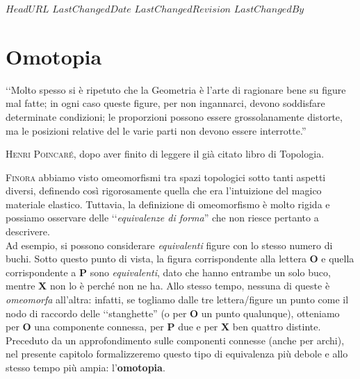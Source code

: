 \svnidlong
{$HeadURL$}
{$LastChangedDate$}
{$LastChangedRevision$}
{$LastChangedBy$}

\chapter{Omotopia}

\begin{introduction}
	‘‘Molto spesso si è ripetuto che la Geometria è l'arte di ragionare bene su figure mal fatte; in ogni caso queste figure, per non ingannarci, devono soddisfare determinate condizioni; le proporzioni
	possono essere grossolanamente distorte, ma le posizioni relative del
	le varie parti non devono essere interrotte.''
	\begin{flushright}
		\textsc{Henri Poincaré,} dopo aver finito di leggere il già citato libro di Topologia.
	\end{flushright}
\end{introduction}
\lettrine[findent=1pt, nindent=0pt]{F}{inora} abbiamo visto omeomorfismi tra spazi topologici sotto tanti aspetti diversi, definendo così rigorosamente quella che era l'intuizione del magico materiale elastico. Tuttavia, la definizione di omeomorfismo è molto rigida e possiamo osservare delle ‘‘\textit{equivalenze di forma}'' che non riesce pertanto a descrivere.\\
Ad esempio, si possono considerare \textit{equivalenti} figure con lo stesso numero di buchi. Sotto questo punto di vista, la figura corrispondente alla lettera \textsf{\textbf{O}} e quella corrispondente a \textsf{\textbf{P}} sono \textit{equivalenti}, dato che hanno entrambe un solo buco, mentre \textsf{\textbf{X}} non lo è perché non ne ha. Allo stesso tempo, nessuna di queste è \textit{omeomorfa} all'altra: infatti, se togliamo dalle tre lettera/figure un punto come il nodo di raccordo delle ‘‘stanghette'' (o per \textsf{\textbf{O}} un punto qualunque), otteniamo per \textsf{\textbf{O}} una componente connessa, per \textsf{\textbf{P}} due e per \textsf{\textbf{X}} ben quattro distinte.\\
Preceduto da un approfondimento sulle componenti connesse (anche per archi), nel presente capitolo formalizzeremo questo tipo di equivalenza più debole e allo stesso tempo più ampia: l'\textbf{omotopia}.
